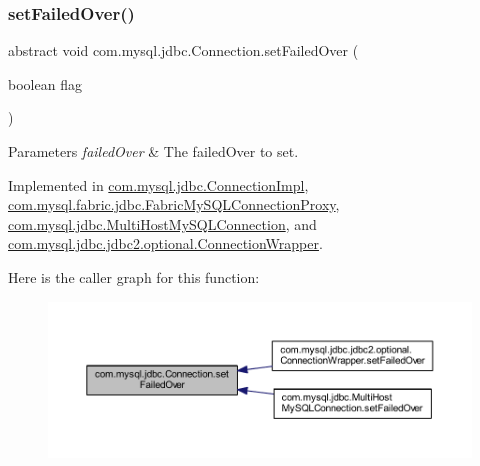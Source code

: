 \subsubsection{\texorpdfstring{set\+Failed\+Over()}{setFailedOver()}}
{\footnotesize\ttfamily abstract void com.\+mysql.\+jdbc.\+Connection.\+set\+Failed\+Over (\begin{DoxyParamCaption}\item[{boolean}]{flag }\end{DoxyParamCaption})\hspace{0.3cm}{\ttfamily [abstract]}}


\begin{DoxyParams}{Parameters}
{\em failed\+Over} & The failed\+Over to set. \\
\hline
\end{DoxyParams}


Implemented in \mbox{\hyperlink{classcom_1_1mysql_1_1jdbc_1_1_connection_impl_aae5bb4c31a9c4260599f64e7cbec0a7a}{com.\+mysql.\+jdbc.\+Connection\+Impl}}, \mbox{\hyperlink{classcom_1_1mysql_1_1fabric_1_1jdbc_1_1_fabric_my_s_q_l_connection_proxy_a610e872bd5d4acf8872f52a93a30a9b2}{com.\+mysql.\+fabric.\+jdbc.\+Fabric\+My\+S\+Q\+L\+Connection\+Proxy}}, \mbox{\hyperlink{classcom_1_1mysql_1_1jdbc_1_1_multi_host_my_s_q_l_connection_af950571e47bab54277504fca71cbefd5}{com.\+mysql.\+jdbc.\+Multi\+Host\+My\+S\+Q\+L\+Connection}}, and \mbox{\hyperlink{classcom_1_1mysql_1_1jdbc_1_1jdbc2_1_1optional_1_1_connection_wrapper_a5ca644a1dbabdfa779153552d47fc826}{com.\+mysql.\+jdbc.\+jdbc2.\+optional.\+Connection\+Wrapper}}.

Here is the caller graph for this function\+:\nopagebreak
\begin{figure}[H]
\begin{center}
\leavevmode
\includegraphics[width=350pt]{interfacecom_1_1mysql_1_1jdbc_1_1_connection_af1a58f95720963635270b83f16d558b0_icgraph}
\end{center}
\end{figure}
\mbox{\label{interfacecom_1_1mysql_1_1jdbc_1_1_connection_ae5192425468c89f3d404ed0dece17cfc}} 
